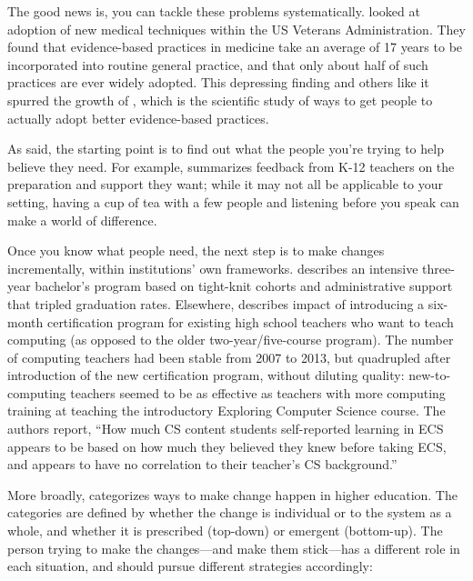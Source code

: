 The good news is, you can tackle these problems systematically.
\cite{Baue2015} looked at adoption of new medical techniques within
the US Veterans Administration.  They found that evidence-based
practices in medicine take an average of 17 years to be incorporated
into routine general practice, and that only about half of such
practices are ever widely adopted.  This depressing finding and others
like it spurred the growth of
, which is
the scientific study of ways to get people to actually adopt better
evidence-based practices.

As  said, the starting point is to find out what
the people you're trying to help believe they need.  For example,
\cite{Yada2016} summarizes feedback from K-12 teachers on the
preparation and support they want; while it may not all be applicable
to your setting, having a cup of tea with a few people and listening
before you speak can make a world of difference.

Once you know what people need, the next step is to make changes
incrementally, within institutions' own frameworks.  \cite{Nara2018}
describes an intensive three-year bachelor's program based on
tight-knit cohorts and administrative support that tripled graduation
rates.  Elsewhere, \cite{Hu2017} describes impact of introducing a
six-month certification program for existing high school teachers who
want to teach computing (as opposed to the older two-year/five-course
program).  The number of computing teachers had been stable from 2007
to 2013, but quadrupled after introduction of the new certification
program, without diluting quality: new-to-computing teachers seemed to
be as effective as teachers with more computing training at teaching
the introductory Exploring Computer Science course.  The authors
report, ``How much CS content students self-reported learning in ECS
appears to be based on how much they believed they knew before taking
ECS, and appears to have no correlation to their teacher's CS
background.''

More broadly, \cite{Borr2014} categorizes ways to make change happen
in higher education.  The categories are defined by whether the change
is individual or to the system as a whole, and whether it is
prescribed (top-down) or emergent (bottom-up). The person trying to
make the changes---and make them stick---has a different role in each
situation, and should pursue different strategies accordingly:

